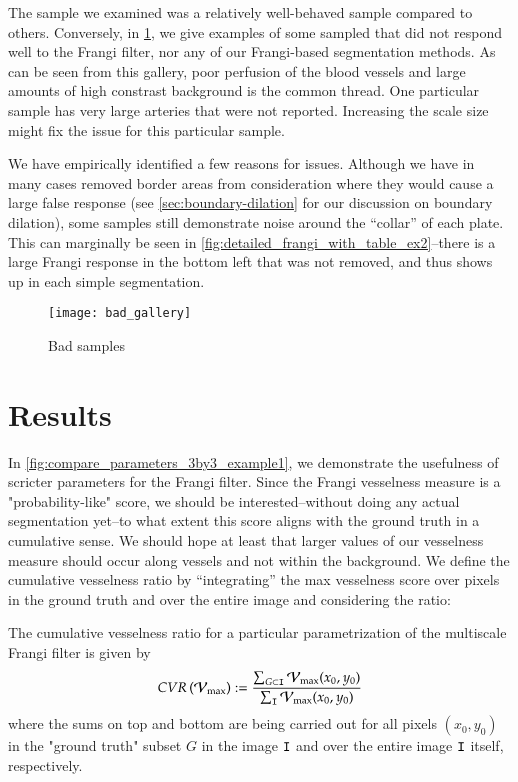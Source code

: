 The sample we examined was a relatively well-behaved sample compared to others. Conversely, in \cref{fig:bad-gallery}, we give examples of some sampled that did not respond well to the Frangi filter, nor any of our Frangi-based segmentation methods. As can be seen from this gallery, poor perfusion of the blood vessels and large amounts of high constrast background is the common thread. One particular sample has very large arteries that were not reported. Increasing the scale size might fix the issue for this particular sample.

We have empirically identified a few reasons for issues. Although we have in many cases removed border areas from consideration where they would cause a large false response (see \cref{sec:boundary-dilation} for our discussion on boundary dilation), some samples still demonstrate noise around the ``collar'' of each plate. This can marginally be seen in \cref{fig:detailed_frangi_with_table_ex2}--there is a large Frangi response in the bottom left that was not removed, and thus shows up in each simple segmentation.


\begin{figure}[p]
	\texttt{[image: bad\_gallery]}
	\caption{Bad samples}
	\label{fig:bad-gallery}
\end{figure}

\section{Results}

In \cref{fig:compare_parameters_3by3_example1}, we demonstrate the usefulness of scricter parameters for the Frangi filter. Since the Frangi vesselness measure is a "probability-like" score, we should be interested--without doing any actual segmentation yet--to what extent this score aligns with the ground truth in a cumulative sense. We should hope at least that larger values of our vesselness measure should occur along vessels and not within the background. We define the cumulative vesselness ratio by ``integrating'' the max vesselness score over pixels in the ground truth and over the entire image and considering the ratio:

\begin{defn} The cumulative vesselness ratio for a particular parametrization of the multiscale Frangi filter is given by
	\begin{equation}
	CVR\left(\mathcal{V}_{\max}\right) := \frac{\sum_{G\subset\mathtt{I}} \mathcal{V}_{\max}(x_0, y_0)}{\sum_{\mathtt{I}} \mathcal{V}_{\max}(x_0,y_0)}
	\end{equation}
	where the sums on top and bottom are being carried out for all pixels $(x_0,y_0)$ in the "ground truth" subset $G$ in the image $\mathtt{I}$
	and over the entire image $\mathtt{I}$ itself, respectively.
\end{defn}

